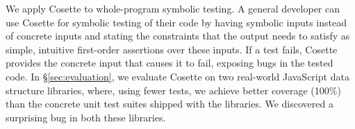 \documentclass[sigconf, review]{acmart}
\newcommand{\jsil}{JSIL\xspace}
\newcommand{\JSComp}{JS-2-JSIL\xspace}
\newcommand{\cosette}{Cosette\xspace}
\newcommand{\pgmaxinline}[1]{ {\color{purple} *** PG : #1 ***} }
\begin{document}


















We apply Cosette to whole-program symbolic testing. 
A general developer can use \cosette for symbolic testing of
their code by having symbolic inputs instead of concrete
inputs and stating the constraints that the output needs to satisfy as
simple, intuitive first-order assertions over these inputs. If
a test fails, \cosette provides the concrete input that causes it to
fail, exposing bugs in the tested code. In \S\ref{sec:evaluation}, 
we evaluate \cosette on two real-world JavaScript data structure libraries,
where, using fewer tests, we achieve better coverage (100\%) than
the concrete unit test suites shipped with the libraries.
We discovered a surprising bug in both these libraries.
\end{document}
